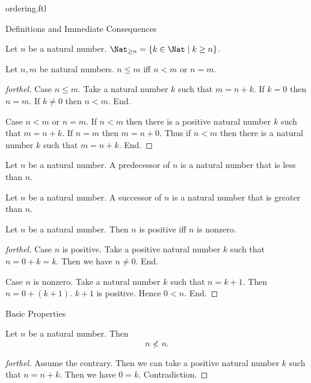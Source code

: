 \documentclass{naproche-library}
\begin{document}
\begin{smodule}[title=The Standard Ordering of the Natural Numbers]{ordering.ftl}
\begin{sfragment}{Definitions and Immediate Consequences}
  \begin{definition}[forthel,id=ARITHMETIC_04_1706933421604864]
    Let $n$ be a natural number.
    $\Nat_{\geq n} = \{ k \in \Nat \mid k \geq n \}$.
  \end{definition}

  \begin{proposition}[forthel,id=ARITHMETIC_04_5385415374667776]
    Let $n, m$ be natural numbers.
    $n \leq m$ iff $n < m$ or $n = m$.
  \end{proposition}
  \begin{proof}[forthel]
    Case $n \leq m$.
      Take a natural number $k$ such that $m = n + k$.
      If $k = 0$ then $n = m$. If $k \neq 0$ then $n < m$.
    End.

    Case $n < m$ or $n = m$.
      If $n < m$ then there is a positive natural number $k$ such that $m = n + k$.
      If $n = m$ then $m = n + 0$.
      Thus if $n < m$ then there is a natural number $k$ such that $m = n + k$.
    End.
  \end{proof}

  \begin{definition}[forthel,id=ARITHMETIC_04_6232154608500736]
    Let $n$ be a natural number.
    A predecessor of $n$ is a natural number that is less than $n$.
  \end{definition}

  \begin{definition}[forthel,id=ARITHMETIC_04_8147686326796288]
    Let $n$ be a natural number.
    A successor of $n$ is a natural number that is greater than $n$.
  \end{definition}

  \begin{proposition}[forthel,id=ARITHMETIC_04_4826285599621120]
    Let $n$ be a natural number.
    Then $n$ is positive iff $n$ is nonzero.
  \end{proposition}
  \begin{proof}[forthel]
    Case $n$ is positive.
      Take a positive natural number $k$ such that $n = 0 + k = k$.
      Then we have $n \neq 0$.
    End.

    Case $n$ is nonzero.
      Take a natural number $k$ such that $n = k + 1$.
      Then $n = 0 + (k + 1)$.
      $k + 1$ is positive.
      Hence $0 < n$.
    End.
  \end{proof}
\end{sfragment}

\begin{sfragment}{Basic Properties}
  \begin{proposition}[forthel,id=ARITHMETIC_04_1037693395927040]
    Let $n$ be a natural number.
    Then \[ n \nless n. \]
  \end{proposition}
  \begin{proof}[forthel]
    Assume the contrary.
    Then we can take a positive natural number $k$ such that $n = n + k$.
    Then we have $0 = k$.
    Contradiction.
  \end{proof}


\end{sfragment}
\end{smodule}
\end{document}
